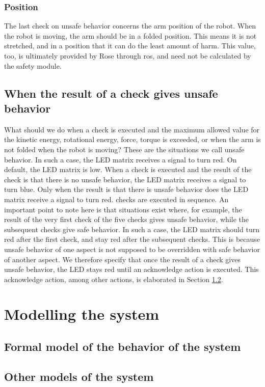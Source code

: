 \documentclass[12pt]{scrreprt}
\begin{document}
\subsubsection{Position}
The last check on unsafe behavior concerns the arm position of the robot. When the robot is moving, the arm should be in a folded position. This means it is not stretched, and in a position that it can do the least amount of harm. This value, too, is ultimately provided by Rose through \acrshort{ros}, and need not be calculated by the safety module.

\subsection{When the result of a check gives unsafe behavior}
What should we do when a check is executed and the maximum allowed value for the kinetic energy, rotational energy, force, torque is exceeded, or when the arm is not folded when the robot is moving? 
These are the situations we call unsafe behavior. In such a case, the LED matrix receives a signal to turn red. On default, the LED matrix is low. When a check is executed and the result of the check is that there is no unsafe behavior, the LED matrix receives a signal to turn blue. Only when the result is that there is unsafe behavior does the LED matrix receive a signal to turn red. checks are executed in sequence. An important point to note here is that situations exist where, for example, the result of the very first check of the five checks gives unsafe behavior, while the subsequent checks give safe behavior. In such a case, the LED matrix should turn red after the first check, and stay red after the subsequent checks. This is because unsafe behavior of one aspect is not supposed to be overridden with safe behavior of another aspect. We therefore specify that once the result of a check gives unsafe behavior, the LED stays red until an acknowledge action is executed. This acknowledge action, among other actions, is elaborated in Section \ref{}.

\section{Modelling the system}
\subsection{Formal model of the behavior of the system}
\subsection{Other models of the system}
\end{document}
